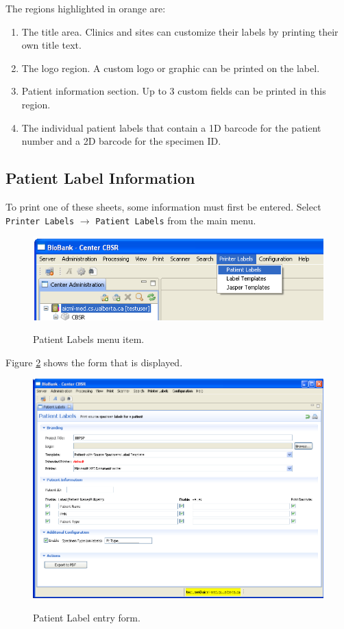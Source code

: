 The regions highlighted in orange are:
\begin{enumerate}
  \item The title area. Clinics and sites can customize their labels by
    printing their own title text.
  \item The logo region. A custom logo or graphic can be printed on the label.
  \item Patient information section. Up to 3 custom fields can be printed in
    this region.
  \item The individual patient labels that contain a 1D barcode for the patient
    number and a 2D barcode for the specimen ID.
\end{enumerate}

\subsection{Patient Label Information}

To print one of these sheets, some information must first be entered. Select
\texttt{Printer Labels} $\to$ \texttt{Patient Labels} from the main menu.

\begin{figure}[H]
  \centering
  \scalebox{0.35}
	   { \includegraphics*{screenshots/printer_labels/02_patient_labels_menu_item} }
	   \caption{Patient Labels menu item.}
	   \label{fig:patient_labels_menu_item}
\end{figure}

Figure \ref{fig:patient_label_form} shows the form that is displayed.

\begin{figure}[H]
  \centering
  \scalebox{0.35}
	   { \includegraphics*{screenshots/printer_labels/03_patient_label_form} }
	   \caption{Patient Label entry form.}
	   \label{fig:patient_label_form}
\end{figure}

